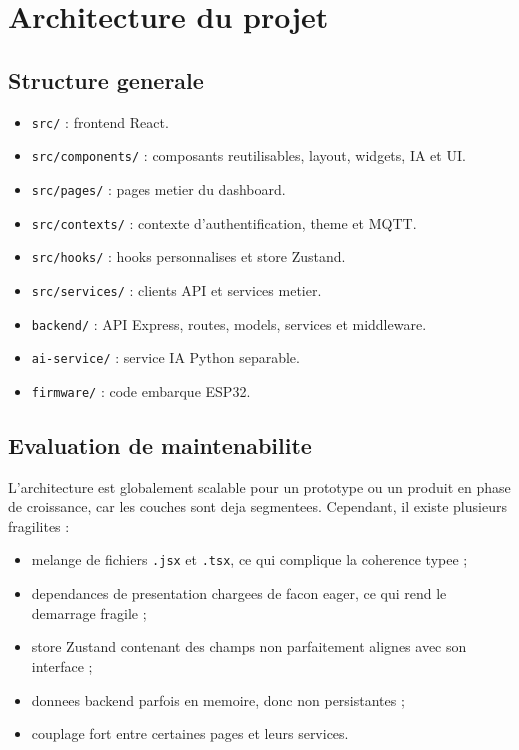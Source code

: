 \documentclass[11pt,a4paper]{article}
\begin{document}
\section{Architecture du projet}
\subsection{Structure generale}
\begin{itemize}[leftmargin=1.2cm]
  \item \texttt{src/} : frontend React.
  \item \texttt{src/components/} : composants reutilisables, layout, widgets, IA et UI.
  \item \texttt{src/pages/} : pages metier du dashboard.
  \item \texttt{src/contexts/} : contexte d'authentification, theme et MQTT.
  \item \texttt{src/hooks/} : hooks personnalises et store Zustand.
  \item \texttt{src/services/} : clients API et services metier.
  \item \texttt{backend/} : API Express, routes, models, services et middleware.
  \item \texttt{ai-service/} : service IA Python separable.
  \item \texttt{firmware/} : code embarque ESP32.
\end{itemize}

\subsection{Evaluation de maintenabilite}
L'architecture est globalement scalable pour un prototype ou un produit en phase de croissance, car les couches sont deja segmentees. Cependant, il existe plusieurs fragilites :
\begin{itemize}[leftmargin=1.2cm]
  \item melange de fichiers \texttt{.jsx} et \texttt{.tsx}, ce qui complique la coherence typee ;
  \item dependances de presentation chargees de facon eager, ce qui rend le demarrage fragile ;
  \item store Zustand contenant des champs non parfaitement alignes avec son interface ;
  \item donnees backend parfois en memoire, donc non persistantes ;
  \item couplage fort entre certaines pages et leurs services.
\end{itemize}
\end{document}

